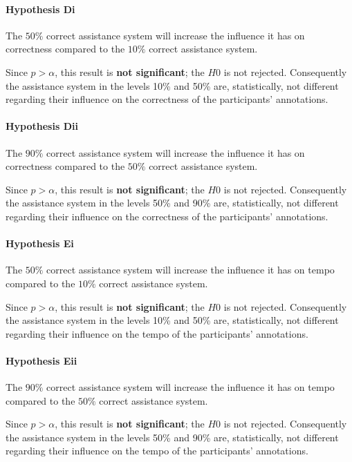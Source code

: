 	\paragraph{Hypothesis Di}
	\lqq The \(50\%\) correct assistance system will increase the influence it has on correctness compared to the \(10\%\) correct assistance system.\rqq

	Since \(p > \alpha\), this result is \textbf{not significant}; the $H0$ is not rejected.
	Consequently the assistance system in the levels 10\% and 50\% are, statistically, not different regarding their influence on the correctness of the participants' annotations.

	\paragraph{Hypothesis Dii}
	\lqq The \(90\%\) correct assistance system will increase the influence it has on correctness compared to the \(50\%\) correct assistance system.\rqq

	Since \(p > \alpha\), this result is \textbf{not significant}; the $H0$ is not rejected.
	Consequently the assistance system in the levels 50\% and 90\% are, statistically, not different regarding their influence on the correctness of the participants' annotations.

	\paragraph{Hypothesis Ei}
	\lqq The \(50\%\) correct assistance system will increase the influence it has on tempo compared to the \(10\%\) correct assistance system.\rqq

	Since \(p > \alpha\), this result is \textbf{not significant}; the $H0$ is not rejected.
	Consequently the assistance system in the levels 10\% and 50\% are, statistically, not different regarding their influence on the tempo of the participants' annotations.

	\paragraph{Hypothesis Eii}
	\lqq The \(90\%\) correct assistance system will increase the influence it has on tempo compared to the \(50\%\) correct assistance system.\rqq

	Since \(p > \alpha\), this result is \textbf{not significant}; the $H0$ is not rejected.
	Consequently the assistance system in the levels 50\% and 90\% are, statistically, not different regarding their influence on the tempo of the participants' annotations.


